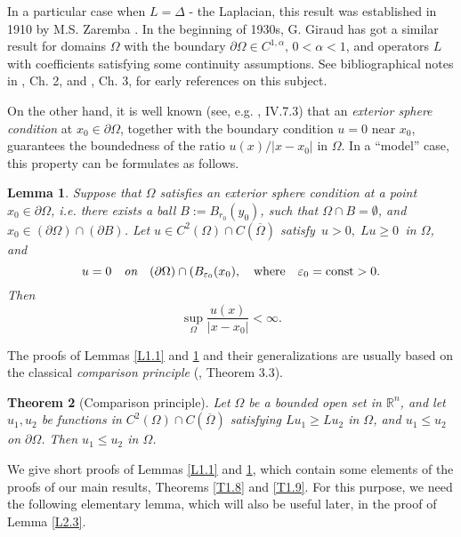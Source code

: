 \documentclass[regno,12pt]{amsart}
\newtheorem{theorem}{Theorem}[section]
\newtheorem{lemma}[theorem]{Lemma}
\theoremstyle{definition}
\theoremstyle{remark}
\begin{document}
In a particular case when $L=\Delta$ - the Laplacian, this result was established in 1910 by M.S. Zaremba \cite{Z10}. In the beginning of 1930s, G. Giraud \cite{G33} has got a similar result for domains $\Omega$ with the boundary ${\partial\Omega}\in C^{1,\alpha},\,0<\alpha<1$, and operators $L$ with coefficients satisfying some continuity assumptions. See bibliographical notes in \cite{PW}, Ch. 2, and \cite{GT}, Ch. 3, for early references on this subject.
\smallskip

On the other hand, it is well known (see, e.g. \cite{CH}, IV.7.3) that an \emph{exterior sphere condition} at $x_0\in{\partial\Omega}$, together with the boundary condition $u=0$ near $x_0$, guarantees the boundedness of the ratio $u(x)/|x-x_0|$ in $\Omega$. In a ``model'' case, this property can be formulates as follows.

\begin{lemma}\label{L1.2}
     Suppose that $\Omega$ satisfies an \emph{exterior sphere condition} at a point $x_0\in{\partial\Omega}$, i.e. there exists a ball
     $B:=B_{r_0}(y_0)$, such that $\Omega\cap B={\emptyset}$, and $x_0\in ({\partial\Omega})\cap ({\partial} B)$.
     Let $u\in C^2(\Omega)\cap C({\overline{\Omega}})$ satisfy $\,u>0,\;Lu\ge 0\,$ in $\Omega$, and
     \[ u=0 {\quad\emph{{on}}\quad} ({\partial\Omega})\cap(B_{{\varepsilon}_0}(x_0),
     {\quad\text{{where}}\quad} {\varepsilon}_0={{\rm const}}>0.\]
     Then
     \begin{equation}\label{1.4}
        \sup_{\Omega} \frac{u(x)}{|x-x_0|}<{\infty}.
     \end{equation}
\end{lemma}

The proofs of Lemmas \ref{L1.1} and \ref{L1.2} and their generalizations are usually based on the classical \emph{comparison principle} (\cite{GT}, Theorem 3.3).

\begin{theorem}[Comparison principle]\label{T1.3}
    Let $\Omega$ be a bounded open set in ${{\mathbb R}^n}$, and let $u_1,u_2$ be functions in $C^2(\Omega)\cap C({\overline{\Omega}})$ satisfying $Lu_1\ge Lu_2$ in $\Omega$, and $u_1\le u_2$ on ${\partial\Omega}$. Then $u_1\le u_2$ in $\Omega$.
\end{theorem}

We give short proofs of Lemmas \ref{L1.1} and \ref{L1.2}, which contain some elements of the proofs of our main results, Theorems \ref{T1.8}  and \ref{T1.9}. For this purpose, we need the following elementary lemma, which will also be useful later, in the proof of Lemma \ref{L2.3}.
\end{document}
